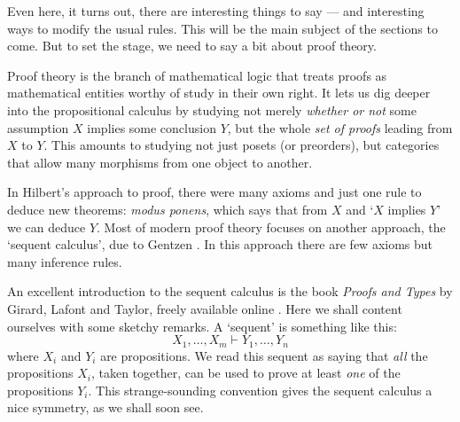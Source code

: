 \documentclass[12pt]{article}
\newcommand{\lHom}{\vdash}
\begin{document}
Even here, it turns out, there are interesting things to say --- and
interesting ways to modify the usual rules.  This will be the
main subject of the sections to come.  But to set the stage, we 
need to say a bit about proof theory.

Proof theory is the branch of mathematical logic that treats proofs
as mathematical entities worthy of study in their own right.
It lets us dig deeper into the propositional calculus by studying 
not merely {\it whether or not} some assumption $X$ implies some 
conclusion $Y$, but the whole {\it set of proofs} leading from $X$ to 
$Y$.  This amounts to studying not just posets (or preorders), but
categories that allow many morphisms from one object to another.

In Hilbert's approach to proof, there were many axioms and just one rule 
to deduce new theorems: {\em modus ponens}, which says that from $X$ 
and `$X$ implies $Y$' we can deduce $Y$.  Most of modern proof theory 
focuses on another approach, the `sequent calculus', due to 
Gentzen \cite{Gentzen}.  In this approach there are few axioms 
but many inference rules.  

An excellent introduction to the sequent calculus is the book 
{\it Proofs and Types} by Girard, Lafont and Taylor, freely available
online \cite{GLT}.   Here we shall content ourselves with some sketchy
remarks.  A `sequent' is something like this:
\[          X_1, \dots, X_m \lHom Y_1, \dots , Y_n  \]
where $X_i$ and $Y_i$ are propositions.  We read this sequent as saying
that {\em all} the propositions $X_i$, taken together, can be used
to prove at least {\em one} of the propositions $Y_i$.  This 
strange-sounding convention gives the sequent calculus a nice symmetry, 
as we shall soon see.
\end{document}

